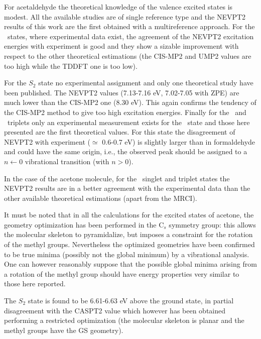 For acetaldehyde the theoretical knowledge of the valence excited states is
modest. All the available studies are of single reference type and the
NEVPT2 results of this work are the first obtained with a multireference
approach. For the \npi\ states, where experimental data exist, the agreement
of the NEVPT2 excitation energies with experiment is good and they show a
sizable improvement with respect to the other theoretical estimations (the
CIS-MP2\cite{jpc-97-4293-1993} and UMP2\cite{jpc-97-4293-1993} values are
too high while the TDDFT\cite{jcp-108-4060-1998} one is too low). 



For the $S_2$ state no experimental assignment and only one theoretical
study have been published. The NEVPT2 values (7.13-7.16 eV, 7.02-7.05 with
ZPE) are much lower than the CIS-MP2\cite{jpc-97-4293-1993} one (8.30 eV).
This again confirms the tendency of the CIS-MP2 method to give too high
excitation energies. Finally for the \pipi\ and \spi\ triplets only an
experimental measurement exists for the \tpipi\ state and those here
presented are the first theoretical values.  For this state the disagreement
of NEVPT2 with experiment ($\simeq$ 0.6-0.7 eV) is slightly larger than in
formaldehyde and could have the same origin, i.e., the observed peak should
be assigned to a $n\leftarrow0$ vibrational transition (with $n> 0$).

In the case of the acetone molecule, for the \npi\ singlet and triplet states
the NEVPT2 results are in a better agreement with the experimental data than
the other available theoretical estimations (apart from the
MRCI\cite{jcp-111-205-1999}).

It must be noted that in all the calculations for the excited states of
acetone, the geometry optimization has been performed in the C$_s$ symmetry
group: this allows the molecular skeleton to pyramidalize, but imposes a
constraint for the rotation of the methyl groups. Nevertheless the optimized
geometries have been confirmed to be true minima (possibly not the global
minimum) by a vibrational analysis. One can however reasonably suppose that
the possible global minima arising from a rotation of the methyl group
should have energy properties very similar to those here reported.  



The $S_2$ state is found to be 6.61-6.63 eV above the ground state, in
partial disagreement with the CASPT2 value\cite{jcp-104-1791-1996} which
however has been obtained performing a restricted optimization (the
molecular skeleton is planar and the methyl groups have the GS geometry).

